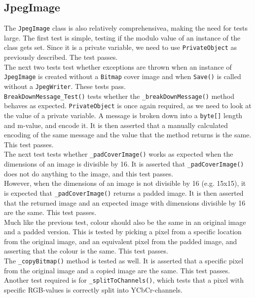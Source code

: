 \subsection*{JpegImage}
The \lstinline|JpegImage| class is also relatively comprehensivea, making the need for tests large.
The first test is simple, testing if the modulo value of an instance of the class gets set.
Since it is a private variable, we need to use \lstinline|PrivateObject| as previously described.
The test passes.\\
The next two tests test whether exceptions are thrown when an instance of \lstinline|JpegImage| is created without a \lstinline|Bitmap| cover image and when \lstinline|Save()| is called without a \lstinline|JpegWriter|.
These tests pass.\\
\lstinline|BreakDownMessage_Test()| tests whether the \lstinline|_breakDownMessage()| method behaves as expected.
\lstinline|PrivateObject| is once again required, as we need to look at the value of a private variable.
A message is broken down into a \lstinline|byte[]| length and m-value, and encode it.
It is then asserted that a manually calculated encoding of the same message and the value that the method returns is the same.
This test passes.\\
The next test tests whether \lstinline|_padCoverImage()| works as expected when the dimensions of an image is divisible by 16.
It is asserted that \lstinline|_padCoverImage()| does not do anything to the image, and this test passes.\\
However, when the dimensions of an image is not divisible by 16 (e.g. 15x15), it is expected that \lstinline|_padCoverImage()| returns a padded image.
It is then asserted that the returned image and an expected image with dimensions divisible by 16 are the same.
This test passes.\\
Much like the previous test, colour should also be the same in an original image and a padded version.
This is tested by picking a pixel from a specific location from the original image, and an equivalent pixel from the padded image, and asserting that the colour is the same.
This test passes.\\
The \lstinline|_copyBitmap()| method is tested as well.
It is asserted that a specific pixel from the original image and a copied image are the same.
This test passes.\\
Another test required is for \lstinline|_splitToChannels()|, which tests that a pixel with specific RGB-values is correctly split into YCbCr-channels.
